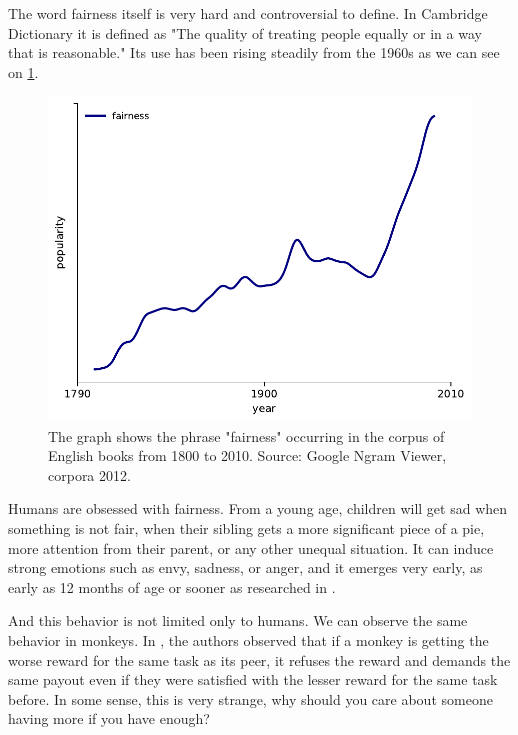 The word fairness
itself is very hard and controversial to define.
In Cambridge Dictionary \cite{fairness_definition} it is
defined as "The quality of treating people equally or in a way that is reasonable." Its use has been rising steadily from the 1960s as we can see on \ref{fig:popularity_of_fairness}.

\begin{figure}[htbp]
    \centering
    \includegraphics{img/google_ngram_fairness-eng_2012-1800-2000.pdf}
    \caption{The graph shows the phrase "fairness" occurring in the corpus of English books from 1800 to 2010. Source: Google Ngram Viewer, corpora 2012. \cite{google_ngram_viewer_2012}}
    \label{fig:popularity_of_fairness}
\end{figure}

Humans are obsessed with fairness. From a young age, children will get sad when something is not fair, when their sibling gets a more significant piece of a pie, more attention from their parent, or any other unequal situation. It can induce strong emotions such as envy, sadness, or anger, and it emerges very early, as early as 12 months of age or sooner as researched in \cite{children_fairness}.

And this behavior is not limited only to humans. We can observe the same behavior in monkeys. In \cite{brosnan2003monkeys}, the authors observed that if a monkey is getting the worse reward for the same task as its peer,  it refuses the reward and demands the same payout even if they were satisfied with the lesser reward for the same task before. In some sense, this is very strange, why should you care about someone having more if you have enough?

